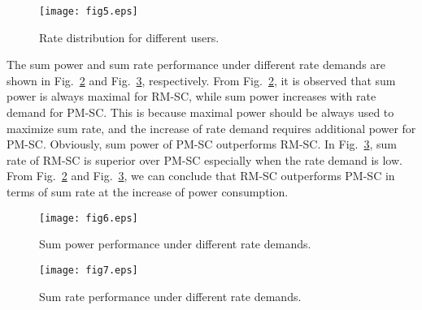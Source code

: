 \documentclass[journal]{IEEEtran}
\begin{document}
\begin{figure}
\centering
\texttt{[image: fig5.eps]}
\vspace{-1em}
\caption{Rate distribution for different users.\label{fig5}}
\vspace{-1em}
\end{figure}

The sum power and sum rate performance under different rate demands are shown in Fig.~\ref{fig7} and Fig.~\ref{fig8}, respectively.
From Fig.~\ref{fig7}, it is observed that sum power is always maximal for RM-SC, while sum power increases with rate demand for PM-SC.
This is because maximal power should be always used to maximize sum rate, and the increase of rate demand requires additional power for PM-SC.
Obviously, sum power of PM-SC outperforms RM-SC.
In Fig.~\ref{fig8}, sum rate of RM-SC is superior over PM-SC especially when the rate demand is low.
From Fig.~\ref{fig7} and Fig.~\ref{fig8}, we can conclude that RM-SC outperforms PM-SC in terms of sum rate at the increase of power consumption.



\begin{figure}
\centering
\texttt{[image: fig6.eps]}
\vspace{-1em}
\caption{Sum power performance under different rate demands.\label{fig7}}
\end{figure}

\begin{figure}
\centering
\texttt{[image: fig7.eps]}
\vspace{-1em}
\caption{Sum rate performance under different rate demands.\label{fig8}}
\vspace{-1em}
\end{figure}
\end{document}
